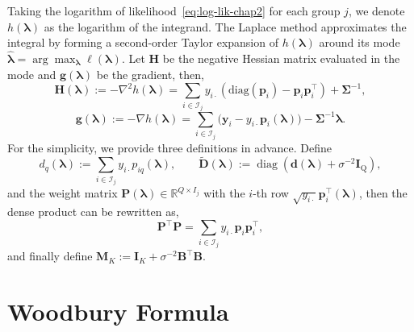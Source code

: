 Taking the logarithm of likelihood~\ref{eq:log-lik-chap2} for each group $j$, we denote $h\left(\bm{\lambda}\right)$ as the logarithm of the integrand. The Laplace  method approximates the integral by forming a second-order Taylor expansion of $h\left(\bm{\lambda}\right)$ around its mode $\hat{\bm{\lambda}} = \arg\max_{\bm{\lambda}}\ell(\bm{\lambda})$. Let $\mathbf{H}$ be the negative Hessian matrix evaluated in the mode and $\mathbf{g}\left(\bm{\lambda}\right)$ be the gradient, then, 
\begin{equation}
    \mathbf{H}(\bm{\lambda}):=-\nabla^{2}h(\bm{\lambda})=\sum_{i\in\mathcal{I}_{j}}y_{i\cdot}\left(\text{diag}(\bm{p}_{i})-\bm{p}_{i}\bm{p}_{i}^{\top}\right)+\bm{\Sigma}^{-1},
    \label{eq: hessian-equality}
\end{equation}
\begin{equation}
    \mathbf{g}\left(\bm{\lambda}\right):=-\nabla h\left(\bm{\lambda}\right)=\sum_{i\in \mathcal{I}_{j}}\bigl(\bm{y}_{i}-y_{i\cdot}\bm{p}_{i}(\bm{\lambda})\bigr)-\bm{\Sigma}^{-1}\bm{\lambda}.
    \label{eq:gradient}
\end{equation}
For the simplicity, we provide three definitions in advance. Define
\begin{equation*}
    d_{q}\left(\bm{\lambda}\right):=\sum_{i\in\mathcal{I}_{j}}y_{i\cdot}p_{iq}\left(\bm{\lambda}\right), \qquad \tilde{\mathbf{D}}\left(\bm{\lambda}\right):=\operatorname{diag}(\mathbf{d}\left(\bm{\lambda}\right)+\sigma^{-2}\mathbf{I}_{\text{Q}}),
\end{equation*}
and the weight matrix $\mathbf{P}\left(\bm{\lambda}\right)\in \mathbb{R}^{Q\times I_{j}}$ with the $i$-th row $\sqrt{y_{i\cdot}}\bm{p}^{\top}_{i}\left(\bm{\lambda}\right)$, then the dense product can be rewritten as,
\begin{equation}
    \mathbf{P}^{\top}\mathbf{P}=\sum_{i\in\mathcal{I}_{j}}y_{i\cdot}\bm{p}_{i}\bm{p}_{i}^{\top},
    \label{eq:weight-prob}
\end{equation}
and finally define $\mathbf{M}_{K}:=\mathbf{I}_{K}+\sigma^{-2}\mathbf{B}^{\top}\mathbf{B}$.

\section{Woodbury Formula}
\label{sec:woodbury}

